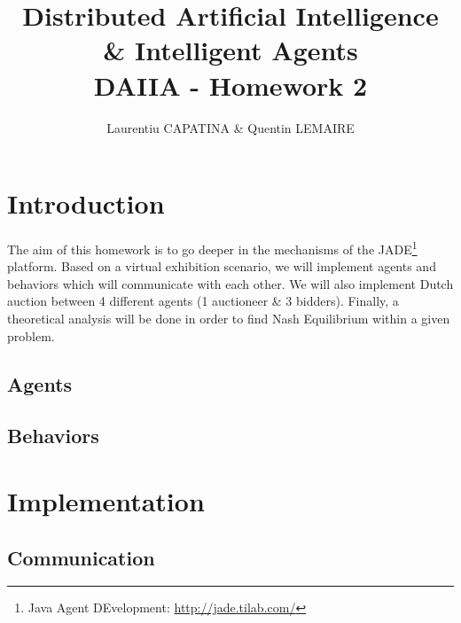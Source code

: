 \documentclass[a4paper,11pt]{article}
\title{Distributed Artificial Intelligence \& Intelligent Agents \\ DAIIA - Homework 2}
\author{Laurentiu CAPATINA \& Quentin LEMAIRE}
\begin{document}
  \maketitle %

  \section{Introduction}
  
  The aim of this homework is to go deeper in the mechanisms of the JADE\footnote{Java Agent DEvelopment: \href{http://jade.tilab.com/}{http://jade.tilab.com/}} 
  platform. 
  Based on a virtual exhibition scenario, we will implement agents and behaviors which will communicate with each other. We will also implement Dutch auction 
  between 4 different agents (1 auctioneer \& 3 bidders). Finally, a theoretical analysis will be done in order to find Nash Equilibrium within a given problem.
  
  \subsection{Agents}


  \subsection{Behaviors}
 

  \newcommand{\pa}{\textit{Profiler Agent}}
  \newcommand{\cu}{\textit{Curator Agent}}
  \renewcommand{\to}{\textit{Tour Guide Agent}}
  
  \section{Implementation}
  
  \subsection{Communication}
\end{document}

